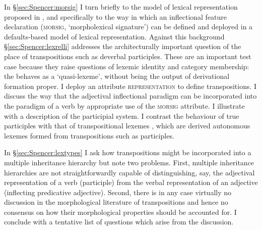 \documentclass[output=paper]{langsci/langscibook}
\begin{document}
In \S\ref{sec:Spencer:morsig}  I turn briefly to the model of lexical representation proposed in %
\citet{Spencer13}%
%
, and specifically to the way in which an inflectional feature declaration (\textsc{morsig}, `morpholexical signature') can be defined and deployed in a defaults-based model of lexical representation.
Against this background \S\ref{sec:Spencer:lexrelli} addresses the architecturally important question of the place of transpositions such as deverbal participles. These are an important test case because they raise questions of lexemic identity and category membership: the  behaves as a `quasi-lexeme', without being the output of derivational  formation proper. I deploy an attribute \textsc{representation} to define transpositions. I discuss the way that the adjectival inflectional paradigm can be incorporated into the paradigm of a verb by appropriate use of the \textsc{morsig} attribute. I illustrate with a description of the  participial system. I contrast the behaviour of true participles with that of transpositional lexemes %
\citep{Spencer13,Spencer16:MorphMetatheory}%
%
, which are derived autonomous lexemes formed from transpositions such as participles.

In \S\ref{sec:Spencer:lextypes} I ask how transpositions might be incorporated into a multiple inheritance hierarchy but note two problems. First, multiple inheritance hierarchies are not straightforwardly capable of distinguishing, say, the adjectival representation of a verb (participle) from the verbal representation of an adjective (inflecting predicative adjective). Second, there is in any case virtually no discussion in the morphological literature of transpositions and hence no consensus on how their morphological properties should be accounted for.
I conclude with a tentative list of questions which arise from the discussion.
\end{document}
